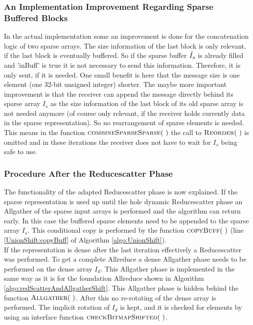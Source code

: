 \subsubsection{An Implementation Improvement Regarding Sparse Buffered Blocks}
In the actual implementation  some an improvement is done for the concatenation logic of two sparse arrays. The size information of the last block is only relevant, if the last block is eventually buffered. So if the sparse buffer $\Tilde{I}_s$ is already filled and 'inBuff' is true it is not necessary to send this information. Therefore, it is only sent, if it is needed. One small benefit is here that the message size is one element (one 32-bit unsigned integer) shorter. The maybe more important improvement is that the receiver can append the message directly behind its sparse array $I_s$ as the size information of the last block of its old sparse array is not needed anymore (of course only relevant, if the receiver holds currently data in the sparse representation). So no rearrangement of sparse elements is needed. This means in the function $\Call{combineSparseSparse}{~}$ the call to $\Call{Reorder}{~}$ is omitted and in these iterations the receiver does not have to wait for $I_s$ being safe to use. 

\subsubsection{Procedure After the Reducescatter Phase}
The functionality of the adapted Reducescatter phase is now explained. If the sparse representation is used up until the hole dynamic Reducescatter phase an Allgather of the sparse input arrays is performed and the algorithm can return early. In this case the buffered sparse elements need to be appended to the sparse array $I_s$. This conditional copy is performed by the function $\Call{copyBuff}{~}$ (line \ref{UnionShift:copyBuff} of Algorithm \ref{algo:UnionShift}). \\
If the representation is dense after the last iteration effectively a Reducescatter was performed. To get a complete Allreduce a dense Allgather phase needs to be performed on the dense array $I_d$. This Allgather phase is implemented in the same way as it is for the foundation Allreduce shown in Algorithm \ref{algo:redScatterAndAllgatherShift}. This Allgather phase is hidden behind the function $\Call{Allgather}{~}$. After this no re-rotating of the dense array is performed. The implicit rotation of $I_d$ is kept, and it is checked for elements by using an interface function $\Call{checkBitmapShifted}{~}$.

